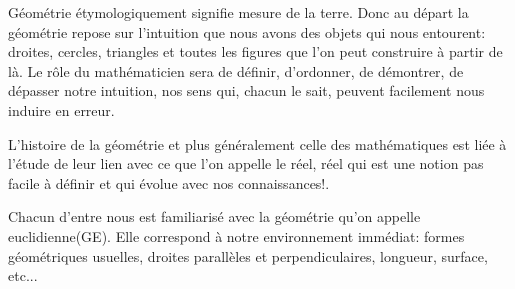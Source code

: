 \documentclass[a4paper, 12pt, twoside]{book}
\begin{document}
                                                                                                                                                                                                                                                                                                                                                                                                                                                                                                                                                                                                                                                                                                                                                                                                                                                                                                                                                                                                                                                                                                                                                                                                                                                                                                                                                                                                                                                                                                                                                                                                                                                                                                                                                                                                                                                                            
   Géométrie étymologiquement signifie mesure de la terre. Donc au départ la géométrie repose sur l'intuition que nous avons des objets qui nous entourent: droites, cercles, triangles et toutes les figures que l'on peut construire à partir de là. Le rôle du mathématicien sera de définir, d'ordonner, de démontrer, de dépasser notre intuition, nos sens qui, chacun le sait, peuvent facilement nous induire en erreur.\bigskip 
   
      L'histoire de la géométrie et plus généralement celle des mathématiques est liée à l'étude de leur lien avec ce que l'on appelle le réel, réel qui est une notion pas facile à définir et qui évolue avec nos connaissances!.\bigskip 
    
   Chacun d'entre nous est familiarisé avec la géométrie qu'on appelle euclidienne(GE). Elle correspond à notre environnement immédiat: formes géométriques usuelles, droites parallèles et perpendiculaires, longueur, surface, etc...                                                                                                                                                                                                                                                                                                                                                                                                                                                                   \bigskip 
\end{document}
